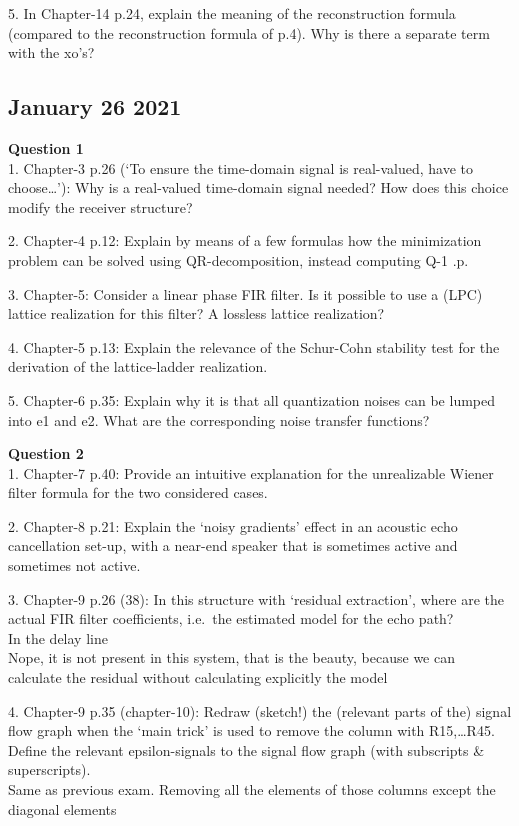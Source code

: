 \documentclass[
  a4paper,
  ,captions=tableheading
]{scrartcl}
\begin{document}
5. In Chapter-14 p.24, explain the meaning of the reconstruction formula
(compared to the reconstruction formula of p.4). Why is there a separate
term with the xo's?

\subsection{January 26 2021}\label{january-26-2021}

\textbf{Question 1}\\
1. Chapter-3 p.26 (`To ensure the time-domain signal is real-valued,
have to choose\ldots{}'): Why is a real-valued time-domain signal
needed? How does this choice modify the receiver structure?

2. Chapter-4 p.12: Explain by means of a few formulas how the
minimization problem can be solved using QR-decomposition, instead
computing Q-1 .p.

3. Chapter-5: Consider a linear phase FIR filter. Is it possible to use
a (LPC) lattice realization for this filter? A lossless lattice
realization?

4. Chapter-5 p.13: Explain the relevance of the Schur-Cohn stability
test for the derivation of the lattice-ladder realization.

5. Chapter-6 p.35: Explain why it is that all quantization noises can be
lumped into e1 and e2. What are the corresponding noise transfer
functions?

\textbf{Question 2}\\
1. Chapter-7 p.40: Provide an intuitive explanation for the unrealizable
Wiener filter formula for the two considered cases.

2. Chapter-8 p.21: Explain the `noisy gradients' effect in an acoustic
echo cancellation set-up, with a near-end speaker that is sometimes
active and sometimes not active.

3. Chapter-9 p.26 (38): In this structure with `residual extraction',
where are the actual FIR filter coefficients, i.e.~the estimated model
for the echo path?\\
In the delay line\\
Nope, it is not present in this system, that is the beauty, because we
can calculate the residual without calculating explicitly the model

4. Chapter-9 p.35 (chapter-10): Redraw (sketch!) the (relevant parts of
the) signal flow graph when the `main trick' is used to remove the
column with R15,\ldots R45. Define the relevant epsilon-signals to the
signal flow graph (with subscripts \& superscripts).\\
Same as previous exam. Removing all the elements of those columns except
the diagonal elements
\end{document}
